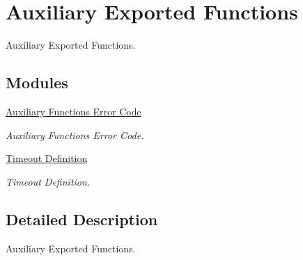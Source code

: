 \hypertarget{group___k_n_x___aux___exported___consts}{}\section{Auxiliary Exported Functions}
\label{group___k_n_x___aux___exported___consts}


Auxiliary Exported Functions.  


\subsection*{Modules}
\begin{DoxyCompactItemize}
\item 
\hyperlink{group___k_n_x___aux___error___code}{Auxiliary Functions\textquotesingle{} Error Code}
\begin{DoxyCompactList}\small\item\em Auxiliary Functions\textquotesingle{} Error Code. \end{DoxyCompactList}\item 
\hyperlink{group___k_n_x___timeout}{Timeout Definition}
\begin{DoxyCompactList}\small\item\em Timeout Definition. \end{DoxyCompactList}\end{DoxyCompactItemize}


\subsection{Detailed Description}
Auxiliary Exported Functions. 


